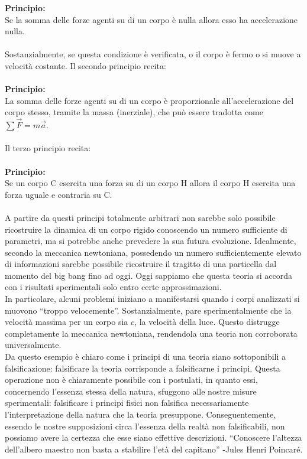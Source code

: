 \documentclass[]{article}
\begin{document}
	\textbf{Principio:}\\
	Se la somma delle forze agenti su di un corpo è nulla allora esso ha accelerazione nulla.
	\\\\ 
	Sostanzialmente, se questa condizione è verificata, o il corpo è fermo o si muove a velocità costante. Il secondo principio recita:
	\\\\
	\textbf{Principio:}\\
	La somma delle forze agenti su di un corpo è proporzionale all'accelerazione del corpo stesso, tramite la massa (inerziale), che può essere tradotta come $\sum\vec{F}=m\vec{a}$.
	\\\\
	Il terzo principio recita: \\\\
	\textbf{Principio:}\\
	Se un corpo C esercita una forza su di un corpo H allora il corpo H esercita una forza uguale e contraria su C.
	\\\\
	A partire da questi principi totalmente arbitrari non sarebbe solo possibile ricostruire la dinamica di un corpo rigido conoscendo un numero sufficiente di parametri, ma si potrebbe anche prevedere la sua futura evoluzione. Idealmente, secondo la meccanica newtoniana, possedendo un numero sufficientemente elevato di informazioni sarebbe possibile ricostruire il tragitto di una particella dal momento del big bang fino ad oggi. Oggi sappiamo che questa teoria si accorda con i risultati sperimentali solo entro certe approssimazioni.\\
	In particolare, alcuni problemi iniziano a manifestarsi quando i corpi analizzati si muovono \enquote{troppo velocemente}. Sostanzialmente, pare sperimentalmente che la velocità massima per un corpo sia $c$, la velocità della luce. Questo distrugge completamente la meccanica newtoniana, rendendola una teoria non corroborata universalmente.\\
	Da questo esempio è chiaro come i principi di una teoria siano sottoponibili a falsificazione: falsificare la teoria corrisponde a falsificarne i principi. Questa operazione non è chiaramente possibile con i postulati, in quanto essi, concernendo l'essenza stessa della natura, sfuggono alle nostre misure sperimentali: falsificare i principi fisici non falsifica necessariamente l'interpretazione della natura che la teoria presuppone. Conseguentemente, essendo le nostre supposizioni circa l'essenza della realtà non falsificabili, non possiamo avere la certezza che esse siano effettive descrizioni. \enquote{Conoscere l'altezza dell'albero maestro non basta a stabilire l'età del capitano} -Jules Henri Poincaré.  
\end{document}
